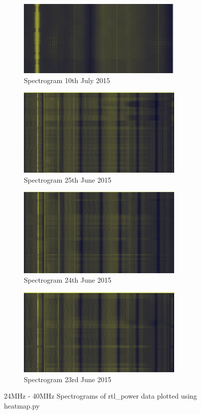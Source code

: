 %

%
\begin{figure}	
	\centering
	\begin{subfigure}[t]{8cm}
		\centering
		\includegraphics[width=8cm]{images/81}
		\caption{Spectrogram 10th July 2015}
		\label{fig:rtl_power_spectrogram_05} 
	\end{subfigure}
	\quad
	\begin{subfigure}[t]{8cm}
		\centering
		\includegraphics[width=8cm]{images/82}
		\caption{Spectrogram 25th June 2015}
		\label{fig:rtl_power_spectrogram_06} 
	\end{subfigure}
	\quad
	\begin{subfigure}[t]{8cm}
		\centering
		\includegraphics[width=8cm]{images/83}
		\caption{Spectrogram 24th June 2015}
		\label{fig:rtl_power_spectrogram_07} 
	\end{subfigure}
	\quad
	\begin{subfigure}[t]{8cm}
		\centering
		\includegraphics[width=8cm]{images/84}
		\caption{Spectrogram 23rd June 2015}
		\label{fig:rtl_power_spectrogram_08} 
	\end{subfigure}
	\quad
	\caption{24MHz - 40MHz Spectrograms of rtl\_power data plotted using heatmap.py}
	\label{fig:rtl_power_spectrogram_dam}
\end{figure}
%



